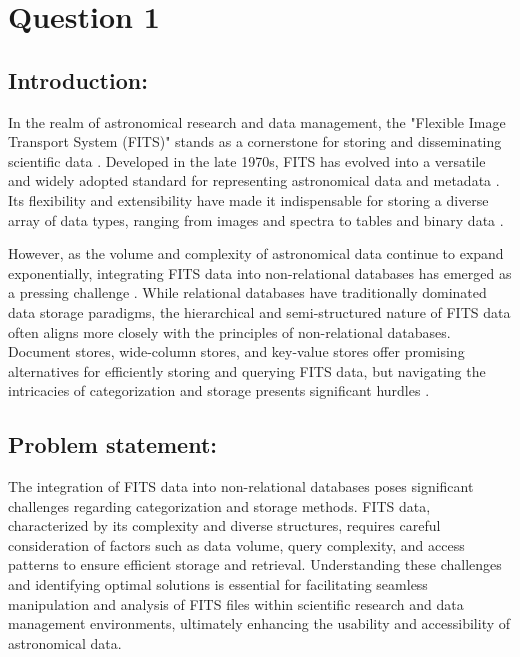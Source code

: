 \documentclass[a4paper,oneside,11pt]{book}
\begin{document}
\MakeTitle 
{} 
\tableofcontents
\renewcommand{\thefigure}{\roman{figure}}
\listoffigures
\cleardoublepage 
{} 

\chapter{Question 1}
\section{Introduction:}
In the realm of astronomical research and data management, the "Flexible Image Transport System (FITS)" stands as a cornerstone for storing and disseminating scientific data \citep{pence2010definition}. Developed in the late 1970s, FITS has evolved into a versatile and widely adopted standard for representing astronomical data and metadata \citep{pence2010definition}. Its flexibility and extensibility have made it indispensable for storing a diverse array of data types, ranging from images and spectra to tables and binary data \citep{pence2010definition}.

However, as the volume and complexity of astronomical data continue to expand exponentially, integrating FITS data into non-relational databases has emerged as a pressing challenge \citep{viswanatham2023big}. While relational databases have traditionally dominated data storage paradigms, the hierarchical and semi-structured nature of FITS data often aligns more closely with the principles of non-relational databases. Document stores, wide-column stores, and key-value stores offer promising alternatives for efficiently storing and querying FITS data, but navigating the intricacies of categorization and storage presents significant hurdles \citep{pattinson2022relational}.
\section{Problem statement:}
The integration of FITS data into non-relational databases poses significant challenges regarding categorization and storage methods. FITS data, characterized by its complexity and diverse structures, requires careful consideration of factors such as data volume, query complexity, and access patterns to ensure efficient storage and retrieval. Understanding these challenges and identifying optimal solutions is essential for facilitating seamless manipulation and analysis of FITS files within scientific research and data management environments, ultimately enhancing the usability and accessibility of astronomical data.
\end{document}
